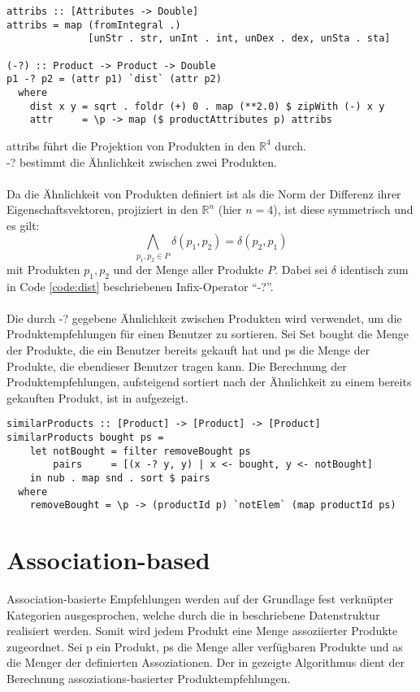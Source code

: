 \begin{lstlisting}[label=code:dist,caption={Algorithmus zur Berechnung der Ähnlichkeit von Produkten}]
attribs :: [Attributes -> Double]
attribs = map (fromIntegral .)
              [unStr . str, unInt . int, unDex . dex, unSta . sta]

(-?) :: Product -> Product -> Double
p1 -? p2 = (attr p1) `dist` (attr p2)
  where
    dist x y = sqrt . foldr (+) 0 . map (**2.0) $ zipWith (-) x y
    attr     = \p -> map ($ productAttributes p) attribs
\end{lstlisting}
\textsf{attribs} führt die Projektion von Produkten in den $\mathbb{R}^4$ durch. \\
\textsf{-?} bestimmt die Ähnlichkeit zwischen zwei Produkten.\\
\\
Da die Ähnlichkeit von Produkten definiert ist als die Norm der Differenz ihrer Eigenschaftsvektoren, projiziert in den $\mathbb{R}^n$ (hier $n = 4$), ist diese symmetrisch und es gilt:
\begin{equation}
  \bigwedge_{p_1, p_2 \in P} \delta\left(p_1, p_2\right) = \delta\left(p_2, p_1\right)
\end{equation}
mit Produkten $p_1, p_2$ und der Menge aller Produkte $P$. Dabei sei $\delta$ identisch zum in Code \ref{code:dist} beschriebenen Infix-Operator \enquote{\textsf{-?}}.\\
\\
Die durch \textsf{-?} gegebene Ähnlichkeit zwischen Produkten wird verwendet, um die Produktempfehlungen für einen Benutzer zu sortieren. Sei \textsf{Set bought} die Menge der Produkte, die ein Benutzer bereits gekauft hat und \textsf{ps} die Menge der Produkte, die ebendieser Benutzer tragen kann. Die Berechnung der Produktempfehlungen, aufsteigend sortiert nach der Ähnlichkeit zu einem bereits gekauften Produkt, ist in  aufgezeigt.

\begin{lstlisting}[label=code:fb-suggestions,caption={Algorithmus zur Generierung feature-basierter Produktempfehlungen}]
similarProducts :: [Product] -> [Product] -> [Product]
similarProducts bought ps = 
    let notBought = filter removeBought ps
        pairs     = [(x -? y, y) | x <- bought, y <- notBought]
    in nub . map snd . sort $ pairs
  where
    removeBought = \p -> (productId p) `notElem` (map productId ps)
\end{lstlisting}


\section{Association-based}
Association-basierte Empfehlungen werden auf der Grundlage fest verknüpter Kategorien ausgesprochen, welche durch die in  beschriebene Datenstruktur realisiert werden. Somit wird jedem Produkt eine Menge assoziierter Produkte zugeordnet. Sei \textsf{p} ein Produkt, \textsf{ps} die Menge aller verfügbaren Produkte und \textsf{as} die Menger der definierten Assoziationen. Der in  gezeigte Algorithmus dient der Berechnung assoziations-basierter Produktempfehlungen.

